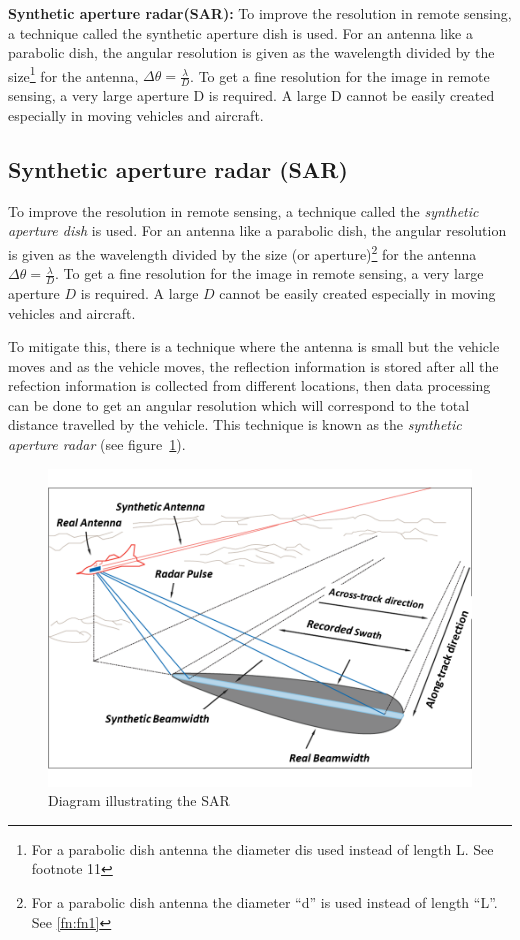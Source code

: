 \textbf{Synthetic aperture radar(SAR):} To improve the resolution in remote sensing, a technique called the synthetic aperture dish is used. For an antenna like a parabolic dish, the angular resolution is given as the wavelength divided by the size\footnote{For a parabolic dish antenna the diameter \textquotesingle d\textquotesingle is used instead of length \textquotesingle L\textquotesingle. See footnote 11} for the antenna, $\Delta \theta = \frac{\lambda}{D}$. To get a fine resolution for the image in remote sensing, a very large aperture D is required. A large D cannot be easily created especially in moving vehicles and aircraft.\\

\subsection{Synthetic aperture radar (SAR)}
To improve the resolution in remote sensing, a technique called the \textit{synthetic aperture dish} is used. For an antenna like a parabolic dish, the angular resolution is given as the wavelength divided by the size (or aperture)\footnote{For a parabolic dish antenna the diameter \textquotedblleft d\textquotedblright \hspace{0.02in} is used instead of length \textquotedblleft L\textquotedblright. See \autoref{fn:fn1}} for the antenna $\Delta \theta = \frac{\lambda}{D}$. To get a fine resolution for the image in remote sensing, a very large aperture $D$ is required. A large $D$ cannot be easily created especially in moving vehicles and aircraft.

To mitigate this, there is a technique where the antenna is small but the vehicle moves and as the vehicle moves, the reflection information is stored after all the refection information is collected from different locations, then data processing can be done to get an angular resolution which will correspond to the total distance travelled by the vehicle. This technique is known as the \textit{synthetic aperture radar} (see figure~\ref{fig:sar2}).
\begin{figure}[h]
\centering
\includegraphics[scale=0.35]{./graphics/sar3}
\caption{Diagram illustrating the SAR}
\label{fig:sar2}
\end{figure}

